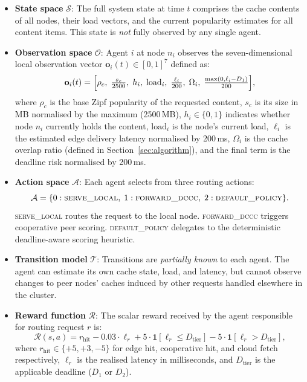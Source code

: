 \documentclass[conference]{IEEEtran}
\begin{document}
\begin{itemize}
  \item \textbf{State space} $\mathcal{S}$: The full system state at
    time $t$ comprises the cache contents of all nodes, their load
    vectors, and the current popularity estimates for all content items.
    This state is \emph{not} fully observed by any single agent.

  \item \textbf{Observation space} $\mathcal{O}$: Agent $i$ at node
    $n_i$ observes the seven-dimensional local observation vector
    $\mathbf{o}_i(t) \in [0,1]^7$ defined as:
    \begin{equation}
      \mathbf{o}_i(t) = \Bigl[
        \rho_c,\;
        \tfrac{s_c}{2500},\;
        h_i,\;
        \mathrm{load}_i,\;
        \tfrac{\ell_i}{200},\;
        \Omega_i,\;
        \tfrac{\max(0,\ell_i - D_1)}{200}
      \Bigr],
      \label{eq:obs}
    \end{equation}
    where $\rho_c$ is the base Zipf popularity of the requested content,
    $s_c$ is its size in MB normalised by the maximum (2500\,MB),
    $h_i \in \{0,1\}$ indicates whether node $n_i$ currently holds
    the content, $\mathrm{load}_i$ is the node's current load,
    $\ell_i$ is the estimated edge delivery latency normalised by
    200\,ms, $\Omega_i$ is the cache overlap ratio (defined in
    Section~\ref{sec:algorithm}), and the final term is the deadline
    risk normalised by 200\,ms.

  \item \textbf{Action space} $\mathcal{A}$: Each agent selects from
    three routing actions:
    \begin{equation}
      \mathcal{A} = \{0: \textsc{serve\_local},\;
                       1: \textsc{forward\_dccc},\;
                       2: \textsc{default\_policy}\}.
    \end{equation}
    \textsc{serve\_local} routes the request to the local node.
    \textsc{forward\_dccc} triggers cooperative peer scoring.
    \textsc{default\_policy} delegates to the deterministic
    deadline-aware scoring heuristic.

  \item \textbf{Transition model} $\mathcal{T}$: Transitions are
    \emph{partially known} to each agent.  The agent can estimate its
    own cache state, load, and latency, but cannot observe changes to
    peer nodes' caches induced by other requests handled elsewhere in
    the cluster.

  \item \textbf{Reward function} $\mathcal{R}$: The scalar reward
    received by the agent responsible for routing request $r$ is:
    \begin{equation}
      \mathcal{R}(s, a) =
        r_{\mathrm{hit}}
        - 0.03 \cdot \ell_r
        + 5 \cdot \mathbf{1}[\ell_r \leq D_{\mathrm{tier}}]
        - 5 \cdot \mathbf{1}[\ell_r > D_{\mathrm{tier}}],
      \label{eq:reward}
    \end{equation}
    where $r_{\mathrm{hit}} \in \{+5, +3, -5\}$ for edge hit,
    cooperative hit, and cloud fetch respectively, $\ell_r$ is the
    realised latency in milliseconds, and $D_{\mathrm{tier}}$ is the
    applicable deadline ($D_1$ or $D_2$).


\end{itemize}
\end{document}
